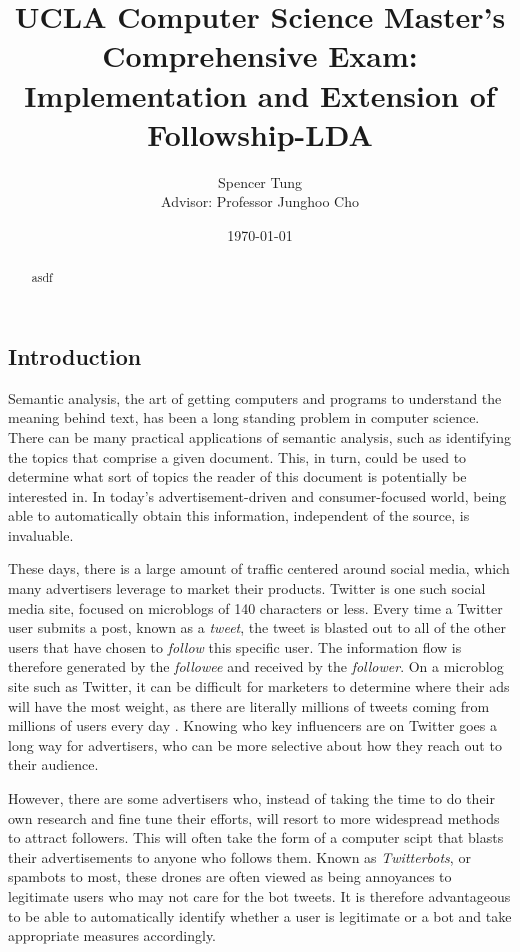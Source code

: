\documentclass[a4paper]{article}
\title{UCLA Computer Science Master's Comprehensive Exam: Implementation and Extension of Followship-LDA}
\author{Spencer Tung \\ Advisor: Professor Junghoo Cho}
\date{\today}
\begin{document}
\maketitle

\begin{multicols}{2}
\begin{abstract}
asdf
\end{abstract}

\section{Introduction}
Semantic analysis, the art of getting computers and programs to understand the meaning behind text, has been a long standing problem in computer science. There can be many practical applications of semantic analysis, such as identifying the topics that comprise a given document. This, in turn, could be used to determine what sort of topics the reader of this document is potentially be interested in. In today's advertisement-driven and consumer-focused world, being able to automatically obtain this information, independent of the source, is invaluable.

These days, there is a large amount of traffic centered around social media, which many advertisers leverage to market their products. Twitter is one such social media site, focused on microblogs of 140 characters or less. Every time a Twitter user submits a post, known as a \textit{tweet}, the tweet is blasted out to all of the other users that have chosen to \textit{follow} this specific user. The information flow is therefore generated by the \textit{followee} and received by the \textit{follower}. On a microblog site such as Twitter, it can be difficult for marketers to determine where their ads will have the most weight, as there are literally millions of tweets coming from millions of users every day \cite{TODO}. Knowing who key influencers are on Twitter goes a long way for advertisers, who can be more selective about how they reach out to their audience.

However, there are some advertisers who, instead of taking the time to do their own research and fine tune their efforts, will resort to more widespread methods to attract followers. This will often take the form of a computer scipt that blasts their advertisements to anyone who follows them. Known as \textit{Twitterbots}, or spambots to most, these drones are often viewed as being annoyances to legitimate users who may not care for the bot tweets. It is therefore advantageous to be able to automatically identify whether a user is legitimate or a bot and take appropriate measures accordingly.


\end{multicols}
\end{document}
